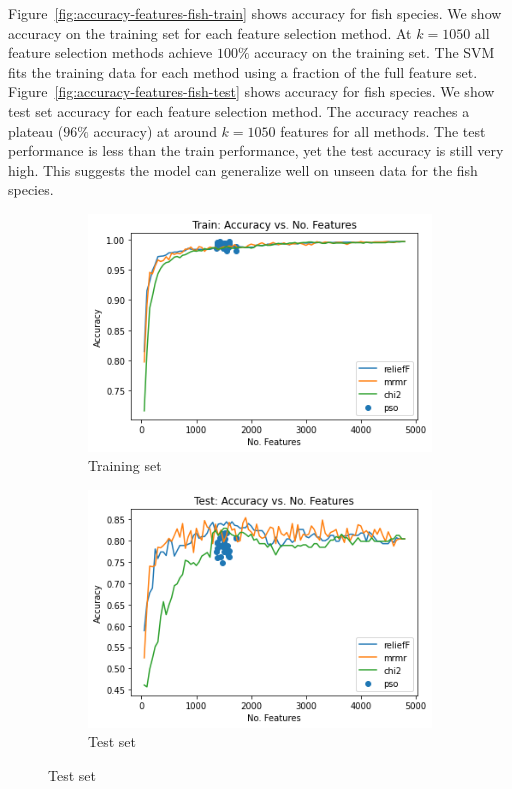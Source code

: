 \documentclass[runningheads]{llncs}
\begin{document}
Figure~\ref{fig:accuracy-features-fish-train} shows accuracy for fish species.
We show accuracy on the training set for each feature selection method.
At $k=1050$ all feature selection methods achieve $100\%$ accuracy on the training set.
The SVM fits the training data for each method using a fraction of the full feature set.
Figure~\ref{fig:accuracy-features-fish-test} shows accuracy for fish species.
We show test set accuracy for each feature selection method.
The accuracy reaches a plateau ($96\%$ accuracy) at around $k=1050$ features for all methods.
The test performance is less than the train performance, yet the test accuracy is still very high.
This suggests the model can generalize well on unseen data for the fish species.

\begin{figure}[htb]
  \centering
  \begin{subfigure}[b]{\linewidth}
    \includegraphics[width=1\linewidth]{accuracy-features-part-train.png}
    \caption{Training set}
    \label{fig:accuracy-features-part-train}
  \end{subfigure}

  \begin{subfigure}[b]{\linewidth}
    \includegraphics[width=1\linewidth]{accuracy-features-part-test.png}
    \caption{Test set}
    \label{fig:accuracy-features-part-test}
  \end{subfigure}


\end{figure}
\end{document}
